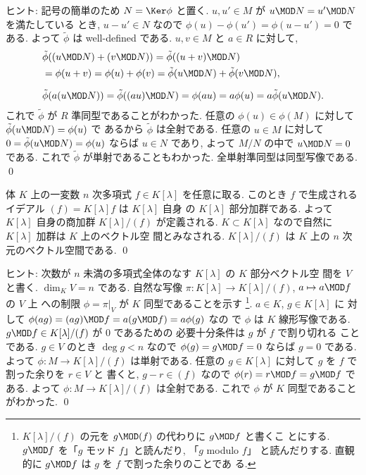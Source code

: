 \documentclass[12pt,twoside]{jarticle}
\begin{document}
\noindent
ヒント: 記号の簡単のため $N=\Ker\phi$ と置く.
$u,u'\in M$ が $u\MOD N = u'\MOD N$ を満たしている
とき, $u-u'\in N$ なので $\phi(u)-\phi(u')=\phi(u-u')=0$ である.
よって $\tilde\phi$ は well-defined である.
$u,v\in M$ と $a\in R$ に対して,
\begin{align*}
  &
  \tilde\phi((u\MOD N)+(v\MOD N))
  = \tilde\phi((u+v)\MOD N)
  \\ &
  = \phi(u+v)
  = \phi(u) + \phi(v)
  =\tilde\phi(u\MOD N) + \tilde\phi(v\MOD N),
  \\[\medskipamount] &
  \tilde\phi(a(u\MOD N))
  = \tilde\phi((au)\MOD N)
  = \phi(au)
  = a\phi(u)
  = a\tilde\phi(u\MOD N).
\end{align*}
これで $\tilde\phi$ が $R$ 準同型であることがわかった.
任意の $\phi(u)\in\phi(M)$ に対して $\tilde\phi(u\MOD N)=\phi(u)$ で
あるから $\tilde\phi$ は全射である.
任意の $u\in M$ に対して $0=\tilde\phi(u\MOD N)=\phi(u)$ ならば $u\in N$ 
であり, よって $M/N$ の中で $u\MOD N = 0$ である. 
これで $\tilde\phi$ が単射であることもわかった.
全単射準同型は同型写像である.  
\qed


\begin{question}
\label{q:dim-K[x]/(f)}
  体 $K$ 上の一変数 $n$ 次多項式 $f\in K[\lambda]$ を任意に取る.
  このとき $f$ で生成されるイデアル $(f)=K[\lambda]f$ は $K[\lambda]$ 自身
  の $K[\lambda]$ 部分加群である.
  よって $K[\lambda]$ 自身の商加群 $K[\lambda]/(f)$ が定義される.
  $K\subset K[\lambda]$ なので自然に $K[\lambda]$ 加群は $K$ 上のベクトル空
  間とみなされる. 
  $K[\lambda]/(f)$ は $K$ 上の $n$ 次元のベクトル空間である.
  \qed
\end{question}

\noindent
ヒント: 次数が $n$ 未満の多項式全体のなす $K[\lambda]$ の $K$ 部分ベクトル空
間を $V$ と書く.  $\dim_K V = n$ である.  
自然な写像 $\pi:K[\lambda]\to K[\lambda]/(f)$, $a\mapsto a\MOD f$ の $V$ 上
への制限 $\phi=\pi|_V$ が $K$ 同型であることを示す%
  \footnote{$K[\lambda]/(f)$ の元を $g\MOD(f)$ の代わりに $g\MOD f$ と書くこ
    とにする.   $g\MOD f$ を「$g$ モッド $f$」と読んだり, 「$g$ modulo $f$」
    と読んだりする.  直観的に $g\MOD f$ は $g$ を $f$ で割った余りのことであ
    る.}. 
$a\in K$, $g\in K[\lambda]$ に
対して $\phi(ag)=(ag)\MOD f= a(g\MOD f)=a\phi(g)$ なの
で $\phi$ は $K$ 線形写像である.
$g\MOD f\in K[\lambda]/(f)$ が $0$ であるための
必要十分条件は $g$ が $f$ で割り切れる
ことである.  $g\in V$ のとき $\deg g < n$ なので $\phi(g)=g\MOD f=0$ 
ならば $g=0$ である. よって $\phi:M\to K[\lambda]/(f)$ は単射である.
任意の $g\in K[\lambda]$ に対して $g$ を $f$ で割った余りを $r\in V$ と
書くと, $g-r\in (f)$ なので $\phi(r)=r\MOD f=g\MOD f$ である.
よって $\phi:M\to K[\lambda]/(f)$ は全射である.
これで $\phi$ が $K$ 同型であることがわかった.
\qed
\end{document}
